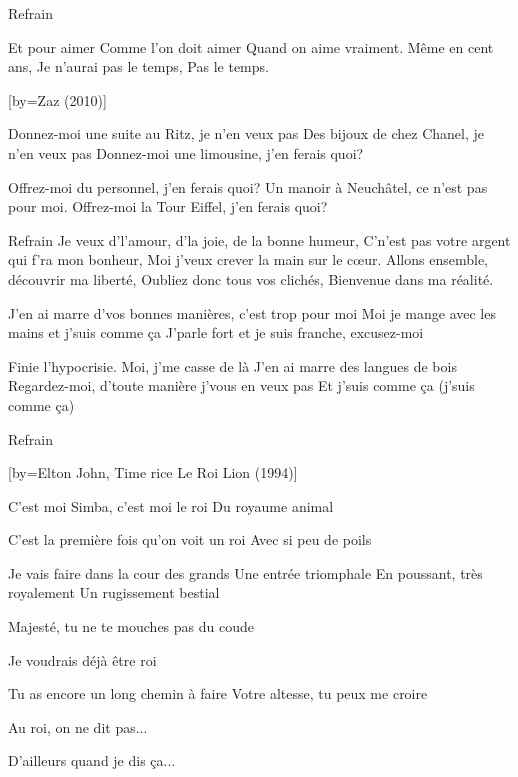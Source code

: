 \beginverse
Refrain
\endverse

\beginverse
Et pour aimer
Comme l'on doit aimer
Quand on aime vraiment.
Même en cent ans,
Je n'aurai pas le temps,
Pas le temps.
\endverse

[by={Zaz (2010)}]

\beginverse
Donnez-moi une suite au Ritz, je n'en veux pas\!
Des bijoux de chez Chanel, je n'en veux pas\!
Donnez-moi une limousine, j'en ferais quoi?
\endverse

\beginverse
Offrez-moi du personnel, j'en ferais quoi?
Un manoir à Neuchâtel, ce n'est pas pour moi.
Offrez-moi la Tour Eiffel, j'en ferais quoi?
\endverse

\beginverse
Refrain
Je veux d'l'amour, d'la joie, de la bonne humeur,
C'n'est pas votre argent qui f'ra mon bonheur,
Moi j'veux crever la main sur le cœur.
Allons ensemble, découvrir ma liberté,
Oubliez donc tous vos clichés,
Bienvenue dans ma réalité.
\endverse

\beginverse
J'en ai marre d'vos bonnes manières, c'est trop pour moi\!
Moi je mange avec les mains et j'suis comme ça\!
J'parle fort et je suis franche, excusez-moi\!
\endverse

\beginverse
Finie l'hypocrisie. Moi, j'me casse de là\!
J'en ai marre des langues de bois\!
Regardez-moi, d'toute manière j'vous en veux pas
Et j'suis comme ça (j'suis comme ça)
\endverse

\beginverse
Refrain \\[3x]
\endverse

[by={Elton John, Time rice \- Le Roi Lion (1994)}]

\beginverse
C’est moi Simba, c’est moi le roi
Du royaume animal
\endverse

\beginverse
C’est la première fois qu’on voit un roi
Avec si peu de poils
\endverse

\beginverse
Je vais faire dans la cour des grands
Une entrée triomphale
En poussant, très royalement
Un rugissement bestial
\endverse

\beginverse
Majesté, tu ne te mouches pas du coude \!
\endverse

\beginverse
Je voudrais déjà être roi \!
\endverse

\beginverse
Tu as encore un long chemin à faire
Votre altesse, tu peux me croire
\endverse

\beginverse
Au roi, on ne dit pas...
\endverse

\beginverse
D’ailleurs quand je dis ça...
\endverse

